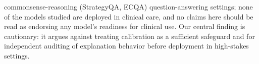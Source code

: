 \documentclass[letterpaper]{article} %
\begin{document}
commonsense-reasoning (StrategyQA, ECQA) question-answering settings; none of the models studied are deployed in clinical care, and no claims here should be read as endorsing any model's readiness for clinical use. Our central finding is cautionary: it argues against treating calibration as a sufficient safeguard and for independent auditing of explanation behavior before deployment in high-stakes settings.




\end{document}
